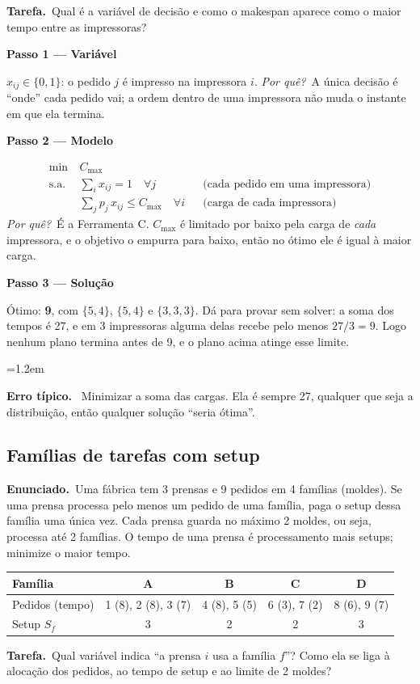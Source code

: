 \documentclass[11pt,a4paper]{article}
\newcommand{\enunciado}{\par\textbf{Enunciado.}\ }
\newcommand{\tarefa}{\par\textbf{Tarefa.}\ }
\newcommand{\passo}[1]{\par\medskip\textbf{#1}\par}
\newcommand{\porque}{\textit{Por quê?}\ }
\newenvironment{nota}[1]{\par\smallskip\begin{list}{}{\leftmargin=1.2em\rightmargin=0pt}\item[]\textbf{#1.}\ }{\end{list}}
\begin{document}
\tarefa Qual é a variável de decisão e como o makespan aparece como o maior tempo entre as impressoras?

\passo{Passo 1 --- Variável}
$x_{ij}\in\{0,1\}$: o pedido $j$ é impresso na impressora $i$. \porque A única decisão é ``onde'' cada pedido
vai; a ordem dentro de uma impressora não muda o instante em que ela termina.

\passo{Passo 2 --- Modelo}
\begin{align*}
  \min\ & C_{\max}\\
  \text{s.a.}\ & \sum_i x_{ij} = 1 \quad\forall j && \text{(cada pedido em uma impressora)}\\
  & \sum_j p_j\,x_{ij} \le C_{\max} \quad\forall i && \text{(carga de cada impressora)}
\end{align*}
\porque É a Ferramenta C. $C_{\max}$ é limitado por baixo pela carga de \emph{cada} impressora, e o objetivo o empurra
para baixo, então no ótimo ele é igual à maior carga.

\passo{Passo 3 --- Solução}
Ótimo: \textbf{9}, com $\{5,4\}$, $\{5,4\}$ e $\{3,3,3\}$. Dá para provar sem solver: a soma dos tempos é 27, e
em 3 impressoras alguma delas recebe pelo menos $27/3=9$. Logo nenhum plano termina antes de 9, e o plano
acima atinge esse limite.

\begin{nota}{Erro típico}
Minimizar a soma das cargas. Ela é sempre 27, qualquer que seja a distribuição, então qualquer solução
``seria ótima''.
\end{nota}

\subsection{Famílias de tarefas com setup}
\enunciado Uma fábrica tem 3 prensas e 9 pedidos em 4 famílias (moldes). Se uma prensa processa pelo menos um
pedido de uma família, paga o setup dessa família uma única vez. Cada prensa guarda no máximo 2 moldes,
ou seja, processa até 2 famílias. O tempo de uma prensa é processamento mais setups; minimize o maior tempo.
\begin{center}
\begin{tabular}{lcccc}
\toprule
Família & A & B & C & D\\
\midrule
Pedidos (tempo) & 1 (8), 2 (8), 3 (7) & 4 (8), 5 (5) & 6 (3), 7 (2) & 8 (6), 9 (7)\\
Setup $S_f$ & 3 & 2 & 2 & 3\\
\bottomrule
\end{tabular}
\end{center}
\tarefa Qual variável indica ``a prensa $i$ usa a família $f$''? Como ela se liga à alocação dos pedidos, ao
tempo de setup e ao limite de 2 moldes?
\end{document}
